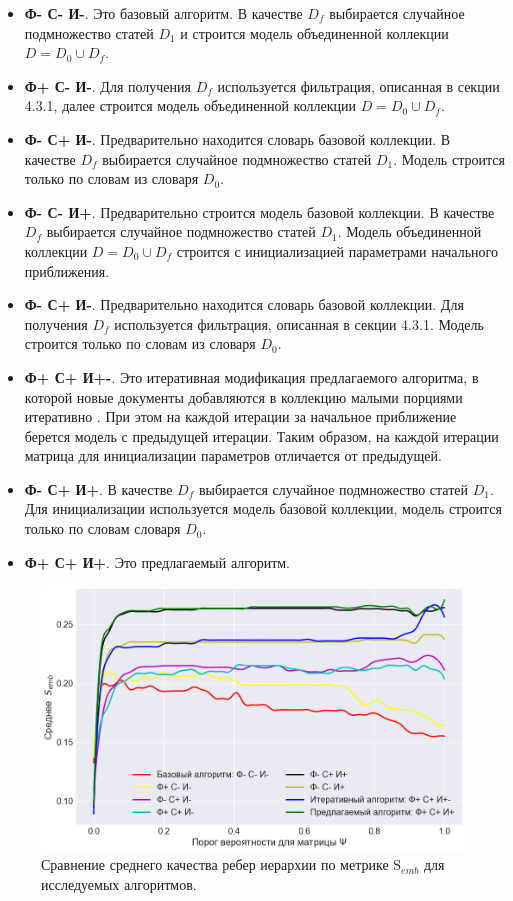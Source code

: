 \begin{itemize}
	\item \textbf{Ф- С- И-}. Это базовый алгоритм. В качестве $D_f$ выбирается случайное подмножество статей $D_1$ и строится модель объединенной коллекции $D = D_0 \cup D_f$. 
	\item \textbf{Ф+ С- И-}. Для получения $D_f$ используется фильтрация, описанная в секции 4.3.1, далее строится модель объединенной коллекции $D = D_0 \cup D_f$. 
	\item \textbf{Ф- С+ И-}. Предварительно находится словарь базовой коллекции. В качестве $D_f$ выбирается случайное подмножество статей $D_1$.  Модель строится только по словам из словаря $D_0$.
	\item \textbf{Ф- С- И+}. Предварительно строится модель базовой коллекции. В качестве $D_f$ выбирается случайное подмножество статей $D_1$. Модель объединенной коллекции $D = D_0 \cup D_f$ строится с инициализацией параметрами начального приближения.
	\item \textbf{Ф- С+ И-}. Предварительно находится словарь базовой коллекции. Для получения $D_f$ используется фильтрация, описанная в секции 4.3.1. Модель строится только по словам из словаря $D_0$.
	\item \textbf{Ф+ С+ И+-}. Это итеративная модификация предлагаемого алгоритма, в которой новые документы добавляются в коллекцию малыми порциями итеративно . При этом на каждой итерации за начальное приближение берется модель с предыдущей итерации. Таким образом, на каждой итерации матрица для инициализации параметров отличается от предыдущей.
	\item \textbf{Ф- С+ И+}. В качестве $D_f$ выбирается случайное подмножество статей $D_1$. Для инициализации используется модель базовой коллекции, модель строится только по словам словаря $D_0$.
	\item \textbf{Ф+ С+ И+}. Это предлагаемый алгоритм.

\end{itemize}

\begin{figure}[h]
    \centering 
    \includegraphics[width=1\textwidth]{img/alg_comparison.png}
    \caption{\label{fig:alg_comparison}Сравнение среднего качества ребер иерархии по метрике $\mathrm{S}_{emb}$ для исследуемых алгоритмов.}
\end{figure}

